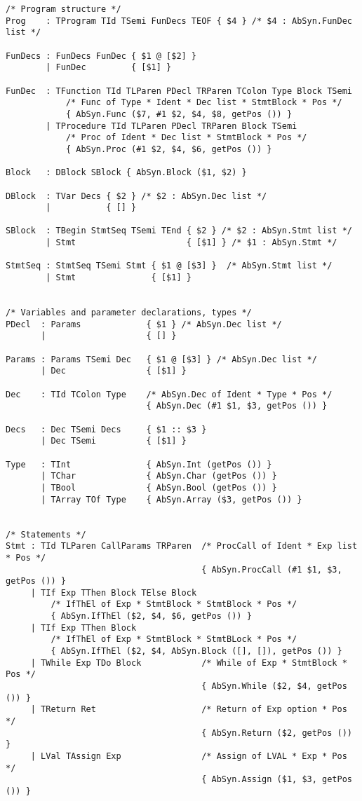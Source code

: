 \begin{lstlisting}[style=MLStyle]
/* Program structure */
Prog    : TProgram TId TSemi FunDecs TEOF { $4 } /* $4 : AbSyn.FunDec list */

FunDecs : FunDecs FunDec { $1 @ [$2] }
        | FunDec         { [$1] }

FunDec  : TFunction TId TLParen PDecl TRParen TColon Type Block TSemi
            /* Func of Type * Ident * Dec list * StmtBlock * Pos */
            { AbSyn.Func ($7, #1 $2, $4, $8, getPos ()) }
        | TProcedure TId TLParen PDecl TRParen Block TSemi
            /* Proc of Ident * Dec list * StmtBlock * Pos */
            { AbSyn.Proc (#1 $2, $4, $6, getPos ()) }

Block   : DBlock SBlock { AbSyn.Block ($1, $2) }

DBlock  : TVar Decs { $2 } /* $2 : AbSyn.Dec list */
        |           { [] }

SBlock  : TBegin StmtSeq TSemi TEnd { $2 } /* $2 : AbSyn.Stmt list */
        | Stmt                      { [$1] } /* $1 : AbSyn.Stmt */

StmtSeq : StmtSeq TSemi Stmt { $1 @ [$3] }  /* AbSyn.Stmt list */
        | Stmt               { [$1] }


/* Variables and parameter declarations, types */
PDecl  : Params             { $1 } /* AbSyn.Dec list */
       |                    { [] }

Params : Params TSemi Dec   { $1 @ [$3] } /* AbSyn.Dec list */
       | Dec                { [$1] }

Dec    : TId TColon Type    /* AbSyn.Dec of Ident * Type * Pos */
                            { AbSyn.Dec (#1 $1, $3, getPos ()) }
                            
Decs   : Dec TSemi Decs     { $1 :: $3 }
       | Dec TSemi          { [$1] }

Type   : TInt               { AbSyn.Int (getPos ()) }
       | TChar              { AbSyn.Char (getPos ()) }
       | TBool              { AbSyn.Bool (getPos ()) }
       | TArray TOf Type    { AbSyn.Array ($3, getPos ()) }


/* Statements */
Stmt : TId TLParen CallParams TRParen  /* ProcCall of Ident * Exp list * Pos */
                                       { AbSyn.ProcCall (#1 $1, $3, getPos ()) }
     | TIf Exp TThen Block TElse Block
         /* IfThEl of Exp * StmtBlock * StmtBlock * Pos */
         { AbSyn.IfThEl ($2, $4, $6, getPos ()) }
     | TIf Exp TThen Block            
         /* IfThEl of Exp * StmtBlock * StmtBLock * Pos */
         { AbSyn.IfThEl ($2, $4, AbSyn.Block ([], []), getPos ()) }
     | TWhile Exp TDo Block            /* While of Exp * StmtBlock * Pos */
                                       { AbSyn.While ($2, $4, getPos ()) }
     | TReturn Ret                     /* Return of Exp option * Pos */
                                       { AbSyn.Return ($2, getPos ()) }
     | LVal TAssign Exp                /* Assign of LVAL * Exp * Pos */
                                       { AbSyn.Assign ($1, $3, getPos ()) }



\end{lstlisting}
